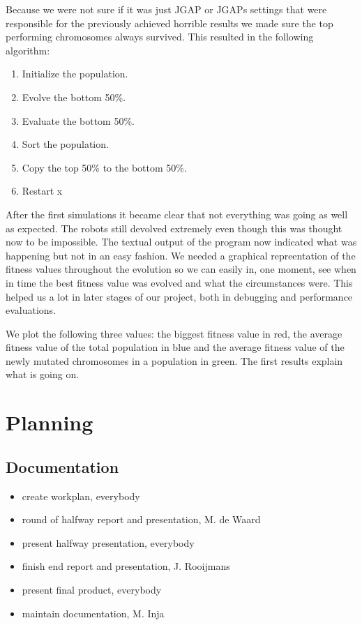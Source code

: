 \documentclass[a4paper,10pt]{article}
\begin{document}
Because we were not sure if it was just JGAP or JGAPs settings that were responsible for the previously achieved horrible results we made sure the top performing 
chromosomes always survived. This resulted in the following algorithm:

\begin{enumerate}
    \item Initialize the population.
    \item Evolve the bottom 50\%.
    \item Evaluate the bottom 50\%.
    \item Sort the population.
    \item Copy the top 50\% to the bottom 50\%.
    \item Restart x 
\end{enumerate}

After the first simulations it became clear that not everything was going as well as expected. The robots still devolved extremely even though this was thought now to be 
impossible. The textual output of the program now indicated what was happening but not in an easy fashion. We needed a graphical repreentation of the fitness values 
throughout the evolution so we can easily in, one moment, see when in time the best fitness value was evolved and what the circumstances were. This helped us a lot in later
stages of our project, both in debugging and performance evaluations.

We plot the following three values: the biggest fitness value in red, the average fitness value of the total population in blue and the average fitness value of the 
newly mutated chromosomes in a population in green. The first results explain what is going on.
  
   
    
\newpage
\section{Planning}
\subsection{Documentation}
\begin{itemize}
 \item create workplan, everybody
 \item round of halfway report and presentation, M. de Waard
 \item present halfway presentation, everybody
 \item finish end report and presentation, J. Rooijmans
 \item present final product, everybody
 \item maintain documentation, M. Inja
\end{itemize}
\end{document}
